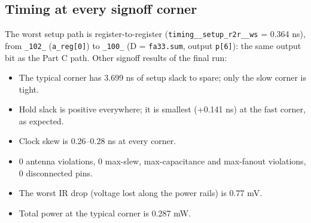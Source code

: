 \documentclass[10pt,a4paper,twocolumn]{article}
\begin{document}
\subsection{Timing at every signoff corner}

\begin{table}[!htbp]
\centering
{}
\caption{Setup and hold slack at each of the 9 signoff corners (final run). Implied $F_{max}$ = 1000 / (7.0 $-$ setup slack).}
\end{table}

The worst setup path is register-to-register (\texttt{timing\_\_setup\_r2r\_\_ws} = 0.364 ns), from
\texttt{\_102\_} (\texttt{a\_reg[0]}) to \texttt{\_100\_} (D = \texttt{fa33.sum}, output \texttt{p[6]}): the
same output bit as the Part C path. Other signoff results of the final run:
\begin{itemize}[nosep]
  \item The typical corner has 3.699 ns of setup slack to spare; only the slow corner is tight.
  \item Hold slack is positive everywhere; it is smallest (+0.141 ns) at the fast corner, as expected.
  \item Clock skew is 0.26--0.28 ns at every corner.
  \item 0 antenna violations, 0 max-slew, max-capacitance and max-fanout violations, 0 disconnected pins.
  \item The worst IR drop (voltage lost along the power rails) is 0.77 mV.
  \item Total power at the typical corner is 0.287 mW.
\end{itemize}
\end{document}
